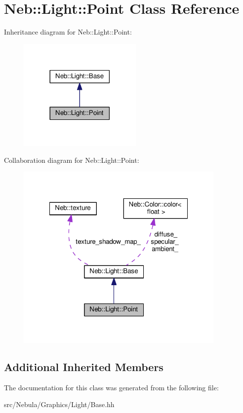 \hypertarget{classNeb_1_1Light_1_1Point}{\section{Neb\-:\-:Light\-:\-:Point Class Reference}
\label{classNeb_1_1Light_1_1Point}
}


Inheritance diagram for Neb\-:\-:Light\-:\-:Point\-:
\nopagebreak
\begin{figure}[H]
\begin{center}
\leavevmode
\includegraphics[width=170pt]{classNeb_1_1Light_1_1Point__inherit__graph}
\end{center}
\end{figure}


Collaboration diagram for Neb\-:\-:Light\-:\-:Point\-:
\nopagebreak
\begin{figure}[H]
\begin{center}
\leavevmode
\includegraphics[width=288pt]{classNeb_1_1Light_1_1Point__coll__graph}
\end{center}
\end{figure}
\subsection*{Additional Inherited Members}


The documentation for this class was generated from the following file\-:\begin{DoxyCompactItemize}
\item 
src/\-Nebula/\-Graphics/\-Light/Base.\-hh\end{DoxyCompactItemize}
